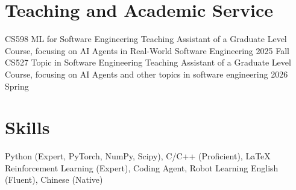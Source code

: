 \resumeSubHeadingListEnd
\vspace{-6mm}


\section{\textbf{Teaching and Academic Service}}
\vspace{-0.4mm}

\resumeSubHeadingListStart

\resumeProject
  {CS598 ML for Software Engineering}
  {Teaching Assistant of a Graduate Level Course, focusing on AI Agents in Real-World Software Engineering}
  {2025 Fall}{}
\resumeProject
  {CS527 Topic in Software Engineering}
  {Teaching Assistant of a Graduate Level Course, focusing on AI Agents and other topics in software engineering}
  {2026 Spring}{}
  
 {}
\resumeSubHeadingListEnd
\vspace{-6mm}



\section{\textbf{Skills}}
\resumeHeadingSkillStart
    {Python (Expert, PyTorch, NumPy, Scipy), C/C++ (Proficient), \LaTeX}
    {Reinforcement Learning (Expert), Coding Agent, Robot Learning}
    {English (Fluent), Chinese (Native)}
\resumeHeadingSkillEnd


